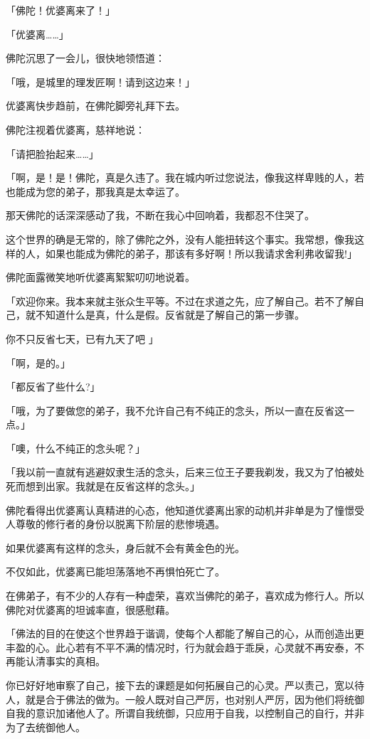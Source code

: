 \documentclass[twoside,openany]{book}
\begin{document}
「佛陀！优婆离来了！」

「优婆离……」

佛陀沉思了一会儿，很快地领悟道：

「哦，是城里的理发匠啊！请到这边来！」

优婆离快步趋前，在佛陀脚旁礼拜下去。

佛陀注视着优婆离，慈祥地说：

「请把脸抬起来……」

「啊，是！是！佛陀，真是久违了。我在城内听过您说法，像我这样卑贱的人，若也能成为您的弟子，那我真是太幸运了。

那天佛陀的话深深感动了我，不断在我心中回响着，我都忍不住哭了。

这个世界的确是无常的，除了佛陀之外，没有人能扭转这个事实。我常想，像我这样的人，如果也能成为佛陀的弟子，那该有多好啊！所以我请求舍利弗收留我!」

佛陀面露微笑地听优婆离絮絮叨叨地说着。

「欢迎你来。我本来就主张众生平等。不过在求道之先，应了解自己。若不了解自己，就不知道什么是真，什么是假。反省就是了解自己的第一步骤。

你不只反省七天，已有九天了吧	」

「啊，是的。」

「都反省了些什么?」

「哦，为了要做您的弟子，我不允许自己有不纯正的念头，所以一直在反省这一点。」

「噢，什么不纯正的念头呢？」

「我以前一直就有逃避奴隶生活的念头，后来三位王子要我剃发，我又为了怕被处死而想到出家。我就是在反省这样的念头。」

佛陀看得出优婆离认真精进的心态，他知道优婆离出家的动机并非单是为了憧憬受人尊敬的修行者的身份以脱离下阶层的悲惨境遇。

如果优婆离有这样的念头，身后就不会有黄金色的光。

不仅如此，优婆离已能坦荡落地不再惧怕死亡了。

在佛弟子，有不少的人存有一种虚荣，喜欢当佛陀的弟子，喜欢成为修行人。所以佛陀对优婆离的坦诚率直，很感慰藉。

「佛法的目的在使这个世界趋于谐调，使每个人都能了解自己的心，从而创造出更丰盈的心。此心若有不平不满的情况时，行为就会趋于乖戾，心灵就不再安泰，不再能认清事实的真相。

你已好好地审察了自己，接下去的课题是如何拓展自己的心灵。严以责己，宽以待人，就是合于佛法的做为。一般人既对自己严厉，也对别人严厉，因为他们将统御自我的意识加诸他人了。所谓自我统御，只应用于自我，以控制自己的自行，并非为了去统御他人。
\end{document}

